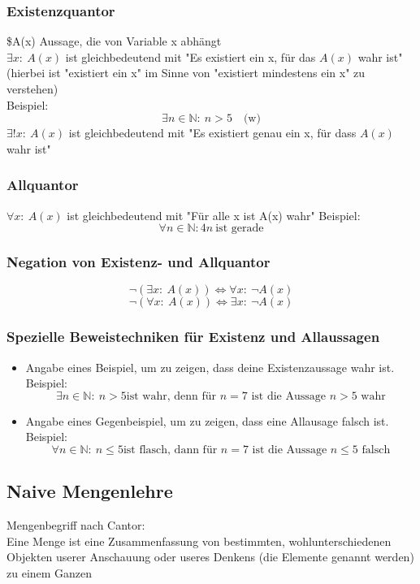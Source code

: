 \documentclass[a4paper]{scrartcl}
\DeclareMathOperator{\Forall}{\forall}
\theoremstyle{definition}
\theoremstyle{plain}
\theoremstyle{plain}
\theoremstyle{remark}
\theoremstyle{remark}
\theoremstyle{remark}
\theoremstyle{remark}
\theoremstyle{remark}
\begin{document}
\subsubsection{Existenzquantor}
\label{sec-2-3-1}
\$A(x) Aussage, die von Variable x abhängt \\
    $\exists x:~A(x)$ ist gleichbedeutend mit "Es existiert ein x, für das $A(x)$ wahr ist" (hierbei ist "existiert ein x" im Sinne von "existiert mindestens ein x" zu verstehen) \\
    Beispiel:
\[\exists n\in\mathbb{N}:~n>5\quad\text{(w)}\]
$\exists !x:~A(x)$ ist gleichbedeutend mit "Es existiert genau ein x, für dass $A(x)$ wahr ist"
\subsubsection{Allquantor}
\label{sec-2-3-2}
$\Forall x:~A(x)$ ist gleichbedeutend mit "Für alle x ist A(x) wahr"
Beispiel:
\[\Forall n\in\mathbb{N}: 4n~\text{ist gerade}\]
\subsubsection{Negation von Existenz- und Allquantor}
\label{sec-2-3-3}
\[\neg(\exists x:~A(x)) \iff \Forall x:~\neg A(x)\]
\[\neg(\Forall x:~A(x)) \iff \exists x:~\neg A(x)\]
\subsubsection{Spezielle Beweistechniken für Existenz und Allaussagen}
\label{sec-2-3-4}
\begin{itemize}
\item Angabe eines Beispiel, um zu zeigen, dass deine Existenzaussage wahr ist. \\
      Beispiel:
\[\exists n\in\mathbb{N}:~n>5 \text{ist wahr, denn für $n = 7$ ist die Aussage $n > 5$ wahr}\]
\item Angabe eines Gegenbeispiel, um zu zeigen, dass eine Allausage falsch ist. \\
      Beispiel:
\[\Forall n\in\mathbb{N}:~n\leq 5 \text{ist flasch, dann für $n=7$ ist die Aussage $n\leq 5$ falsch}\]
\end{itemize}
\subsection{Naive Mengenlehre}
\label{sec-2-4}
Mengenbegriff nach Cantor: \\
   Eine Menge ist eine Zusammenfassung von bestimmten, wohlunterschiedenen Objekten userer Anschauung oder useres Denkens (die Elemente genannt werden) zu einem Ganzen
\end{document}
